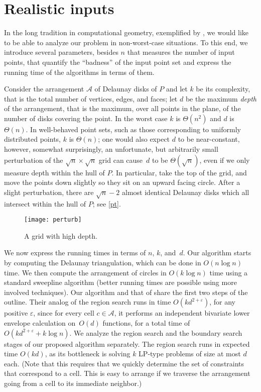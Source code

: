 \documentclass{cccg13}
\newcommand\arr{\mathcal A}
\let\eps\varepsilon
\begin{document}
\section{Realistic inputs}\label{sec:realistic}
In the long tradition in computational geometry, exemplified by \cite{realistic}, we would like to be able to analyze our problem in non-worst-case situations.  To this end, we introduce several parameters, besides $n$ that measures the number of input points, that quantify the ``badness'' of the input point set and express the running time of the algorithms in terms of them. 

Consider the arrangement $\arr$ of Delaunay disks of $P$ and let $k$ be its complexity, that is the total number of vertices, edges, and faces; let $d$ be the maximum \emph{depth} of the arrangement, that is the maximum, over all points in the plane, of the number of disks covering the point. In the worst case $k$ is $\Theta(n^2)$ and $d$ is $\Theta(n)$.  In well-behaved point sets, such as those corresponding to uniformly distributed points, $k$ is $\Theta(n)$; one would also
expect $d$ to be near-constant, however, somewhat surprisingly, an unfortunate, but arbitrarily small perturbation of the $\sqrt n\times \sqrt n$ grid can cause~$d$ to be $\Theta(\sqrt n)$, even if we only measure depth within the hull of $P$.  In particular, take the top of the grid, and move the points down slightly so they sit on an upward facing circle.  After a slight perturbation, there are $\sqrt n - 2$ almost identical Delaunay disks which all intersect within the hull of $P$; see \autoref{pt}.
\begin{figure}
  \centering
  \texttt{[image: perturb]}
  \caption{\label{pt}A grid with high depth.}
\end{figure}

We now express the running times in terms of $n$, $k$, and~$d$.  Our algorithm starts by computing the Delaunay triangulation, which can be done in $O(n\log n)$ time.  We then compute the arrangement of circles in $O(k\log n)$ time using a standard sweepline algorithm (better running times are possible using more involved techniques).  Our algorithm and that of \cite{orig} share the first two steps of the outline.  Their analog of the region search runs in time $O(kd^{2+\eps})$, for any positive $\eps$, since for every cell $c \in \arr$, it performs an independent bivariate lower envelope calculation on~$O(d)$ functions, for a total time of $O(kd^{2+\eps} + k\log n)$.  We analyze the region search and the boundary search stages of our proposed algorithm separately.  The region search runs in expected time $O(kd)$, as its bottleneck is solving $k$ LP-type problems of size at most $d$ each.  (Note that this requires that we quickly determine the set of constraints that correspond to a cell.  This is easy to arrange if we traverse the arrangement going from a cell to its immediate neighbor.)
\end{document}
